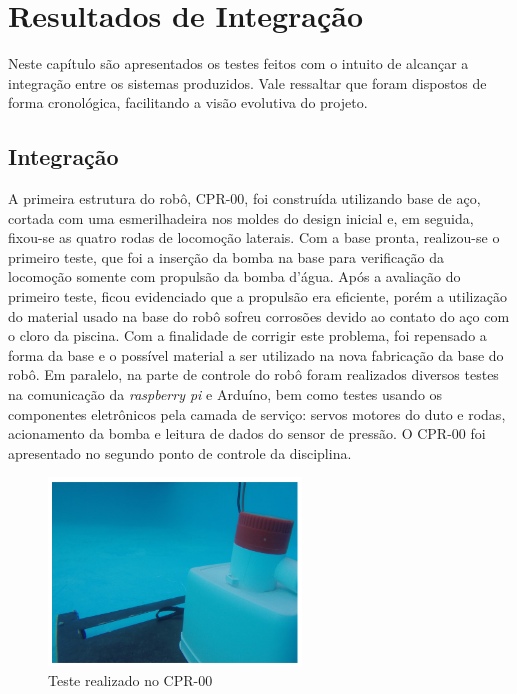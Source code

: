 \chapter{Resultados de Integração}
Neste capítulo são apresentados os testes feitos com o intuito de alcançar
a integração entre os sistemas produzidos. Vale ressaltar que foram dispostos
de forma cronológica, facilitando a visão evolutiva do projeto.

\section{Integração}
A primeira  estrutura do robô, CPR-00, foi construída utilizando base de aço, cortada com uma esmerilhadeira nos moldes do design inicial e, em seguida, fixou-se as quatro rodas de locomoção laterais. Com a base pronta, realizou-se o primeiro teste, que foi a inserção da bomba na base para verificação da locomoção somente com propulsão da bomba d'água. Após a avaliação do primeiro teste, ficou evidenciado que a propulsão era eficiente, porém a utilização do material usado na base do robô sofreu corrosões devido ao contato do aço com o cloro da piscina. Com a finalidade de corrigir este problema, foi repensado a forma da base e o possível material a ser utilizado na nova fabricação da base do robô. Em paralelo, na parte de controle do robô foram realizados diversos testes na comunicação da \textit{raspberry pi} e Arduíno, bem como testes usando os componentes eletrônicos pela camada de serviço: servos motores do duto e rodas, acionamento da bomba e leitura de dados do sensor de pressão. O CPR-00 foi apresentado no segundo ponto de controle da disciplina.

\begin{figure}[h]
  \centering
  \includegraphics[width=0.6\textwidth]{figuras/test.png}
  \caption{Teste realizado no CPR-00}
  \label{fig:test}
\end{figure}
\FloatBarrier


